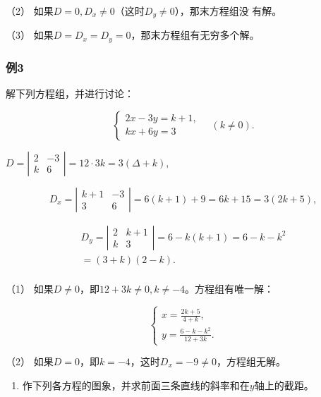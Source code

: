 （2） 如果\(D = 0, D_x \neq 0\)（这时\(D_y \neq 0\)），那末方程组没
有解。

（3） 如果\(D = D_{x} = D_{y} = 0\)，那末方程组有无穷多个解。

\subsubsection{例3}

解下列方程组，并进行讨论：

\[
\left\{ \begin{array}{ll} {2 x - 3 y = k + 1,} \\ {k x + 6 y = 3} \end{array} \right. \quad (k \neq 0).
\]

\(D = \left| \begin{array}{cc}2 & -3\\ k & 6 \end{array} \right| = 12\cdot 3k = 3(\Delta +k),\)

\[
D_{x} = \left| \begin{array}{cc} k + 1 & - 3 \\ 3 & 6 \end{array} \right| = 6 (k + 1) + 9 = 6 k + 15 = 3 (2 k + 5),
\]

\[
\begin{array}{l} D_{y} = \left| \begin{array}{cc} 2 & k + 1 \\ k & 3 \end{array} \right| = 6 - k (k + 1) = 6 - k - k^{2} \\ = (3 + k) (2 - k). \\ \end{array}
\]

（1）
如果\(D \neq 0\)，即\(12 + 3k \neq 0, k \neq -4\)。方程组有唯一解：

\[
\left\{ \begin{array}{l} x = \frac{2 k + 5}{4 + k}, \\ y = \frac{6 - k - k^{2}}{12 + 3 k}. \end{array} \right.
\]

（2） 如果\(D = 0\)，即\(k = -4\)，这时\(D_x = -9 \neq 0\)，方程组无解。

\begin{enumerate}
\item
  作下列各方程的图象，并求前面三条直线的斜率和在\(y\)轴上的截距。
\end{enumerate}

